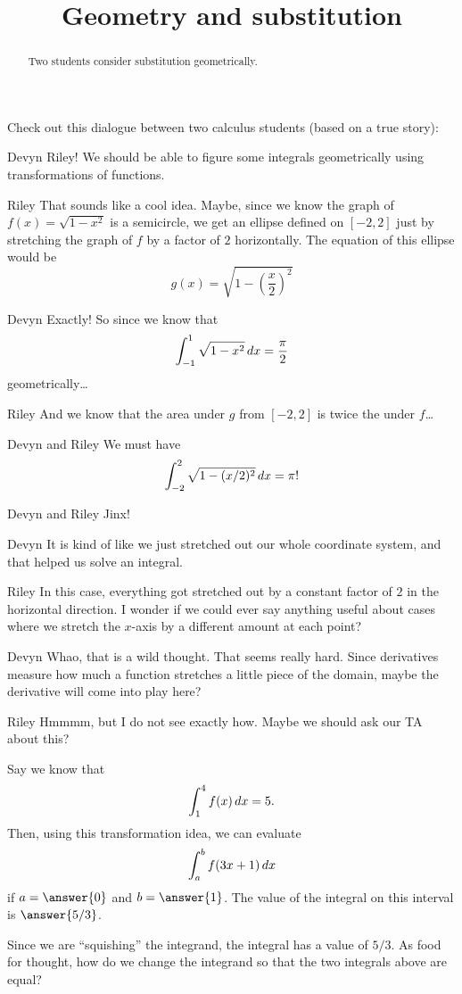 \documentclass{ximera}
\title[Break-Ground:]{Geometry and substitution}
\begin{document}
\begin{abstract}
Two students consider substitution geometrically.
\end{abstract}
\maketitle


Check out this dialogue between two calculus students (based on a true
story):

\begin{dialogue}
\item[Devyn] Riley! We should be able to figure some integrals
  geometrically using transformations of functions.
\item[Riley] That sounds like a cool idea.  Maybe, since we know the
  graph of $f(x) = \sqrt{1-x^2}$ is a semicircle, we get an ellipse
  defined on $[-2,2]$ just by stretching the graph of $f$ by a factor
  of $2$ horizontally.  The equation of this ellipse would be
  \[
  g(x) =\sqrt{1-\left(\frac{x}{2}\right)^2}
  \]
\item[Devyn] Exactly!  So since we know that
  \[
  \int_{-1}^1 \sqrt{1-x^2} \mathop{}\!d x = \frac{\pi}{2}
  \]
  geometrically\dots
\item[Riley] And we know that the area under $g$ from $[-2,2]$ is
  twice the under $f$\dots
\item[Devyn and Riley] We must have
  \[
  \int_{-2}^2 \sqrt{1-(x/2)^2} \mathop{}\!d x =\pi !
  \]
\item[Devyn and Riley] Jinx!
\item[Devyn] It is kind of like we just stretched out our whole
  coordinate system, and that helped us solve an integral.
\item[Riley] In this case, everything got stretched out by a constant
  factor of $2$ in the horizontal direction.  I wonder if we could
  ever say anything useful about cases where we stretch the $x$-axis
  by a different amount at each point?
\item[Devyn] Whao, that is a wild thought.  That seems really hard.
  Since derivatives measure how much a function stretches a little
  piece of the domain, maybe the derivative will come into play here?
\item[Riley] Hmmmm, but I do not see exactly how.  Maybe we should ask
  our TA about this?
\end{dialogue}


\begin{problem}
  Say we know that
  \[
  \int_1^4 f(x) \mathop{}\!d x = 5.
  \]
  Then, using this transformation idea, we can evaluate
  \[
  \int_a^b f(3x+1)\mathop{}\!d x
  \]
  if $a= \answer{0}$ and $b=\answer{1}$.  The value of the integral on
  this interval is $\answer{5/3}$.
  \begin{feedback}
    Since we are ``squishing'' the integrand, the integral has a value
    of $5/3$. As food for thought, how do we change the integrand so
    that the two integrals above are equal?
  \end{feedback}
\end{problem}


\end{document}
